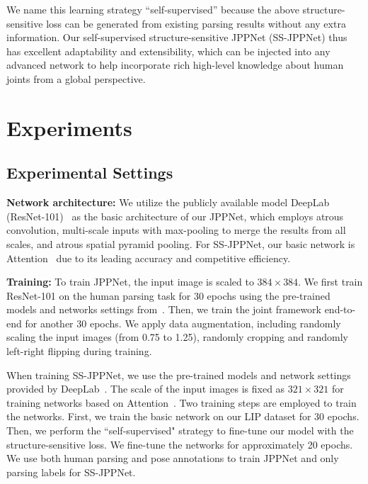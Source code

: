 \documentclass[10pt,journal,compsoc]{IEEEtran}
\begin{document}
We name this learning strategy ``self-supervised'' because the above structure-sensitive loss can be generated from existing parsing results without any extra information. Our self-supervised structure-sensitive JPPNet (SS-JPPNet) thus has excellent adaptability and extensibility, which can be injected into any advanced network to help incorporate rich high-level knowledge about human joints from a global perspective. 







\section{Experiments}
\subsection{Experimental Settings}
\textbf{Network architecture: }
We utilize the publicly available model DeepLab (ResNet-101)~\cite{chen2016deeplab} as the basic architecture of our JPPNet, which employs atrous convolution, multi-scale inputs with max-pooling to merge the results from all scales, and atrous spatial pyramid pooling. For SS-JPPNet, our basic network is Attention~\cite{chen2015attention} due to its leading accuracy and competitive efficiency.

\textbf{Training: }
To train JPPNet, the input image is scaled to $384 \times 384$. We first train ResNet-101 on the human parsing task for 30 epochs using the pre-trained models and networks settings from~\cite{chen2016deeplab}. Then, we train the joint framework end-to-end for another 30 epochs. We apply data augmentation, including randomly scaling the input images (from 0.75 to 1.25), randomly cropping and randomly left-right flipping during training.

When training SS-JPPNet, we use the pre-trained models and network settings provided by DeepLab~\cite{chen2016deeplab}. The scale of the input images is fixed as $321 \times 321$ for training networks based on Attention~\cite{chen2015attention}. Two training steps are employed to train the networks. First, we train the basic network on our LIP dataset for 30 epochs. Then, we perform the ``self-supervised" strategy to fine-tune our model with the structure-sensitive loss. We fine-tune the networks for approximately 20 epochs. We use both human parsing and pose annotations to train JPPNet and only parsing labels for SS-JPPNet.
\end{document}
